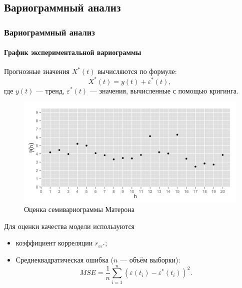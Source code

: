 \documentclass{beamer}
\begin{document}
\subsection{Вариограммный анализ}
\begin{frame}
  \frametitle{Вариограммный анализ}
  \framesubtitle{График экспериментальной вариограммы}
  \begin{multicols}{2}
    Прогнозные значения $ X^{*}(t) $ вычисляются по формуле:
    \begin{equation*}
      X^{*}(t) = y(t) + \varepsilon^{*}(t),
    \end{equation*}
    где $ y(t) $ --- тренд, $ \varepsilon^{*}(t) $ --- значения, вычисленные с помощью кригинга.

  \columnbreak
    \begin{figure}[h]
    \includegraphics[width=1\linewidth]{../../figures/variogram/lin-variogram.png}
    \caption{Оценка семивариограммы Матерона}
  \end{figure}
  \end{multicols}
    Для оценки качества модели используются
    \begin{itemize}
      \item коэффициент корреляции $ r_{\varepsilon\varepsilon^{*}} $;
      \item Среднеквадратическая ошибка ($ n $ --- объём выборки):
        \begin{equation}
        \label{eq:mse}
          MSE = \frac{1}{n} \sum_{i=1}^{n} (\varepsilon(t_i) - \varepsilon^{*}(t_i))^2.
        \end{equation}
    \end{itemize}
  
\end{frame}
\end{document}
